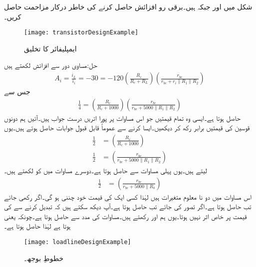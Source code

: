 شکل  میں  اور  جبکہ  ہیں۔برقی رو افزائش  حاصل کرنے کی خاطر  درکار مزاحمت حاصل کریں۔
\begin{figure}
\centering
\texttt{[image: transistorDesignExample]}
\caption{ایمپلیفائر کا تخلیق}
\label{شکل_ٹرانزسٹر_ایمپلیفائر_تخلیق}
\end{figure}

حل:مساوی دور سے افزائش لکھتے ہیں
\begin{align*}
A_i =\frac{i_L}{i_i}=-30 =-120 \left(\frac{R_c}{R_c+R_L}\right) \left(\frac{r_{be}}{r_{be}+r_i \mathbin{\|} R_1 \mathbin{\|} R_2} \right)
\end{align*}
جس سے 
\begin{align}
\frac{1}{4}=\left(\frac{R_c}{R_c+1000}\right) \left(\frac{r_{be}}{r_{be}+5000 \mathbin{\|} R_1 \mathbin{\|} R_2} \right)
\end{align}
حاصل ہوتا ہے۔ایسی وہ تمام قیمتیں جو اس مساوات پر پورا اتریں درست جواب ہیں۔آئیں ہم دونوں قوسین کی قیمتیں برابر رکھ کر دیکھیں۔ایسا کرنے سے عموماً قابل قبول جوابات حاصل ہوتے ہیں۔یوں
\begin{align*}
\frac{1}{2}&=\left(\frac{R_c}{R_c+1000}\right)\\
\frac{1}{2}&=\left(\frac{r_{be}}{r_{be}+5000 \mathbin{\|} R_1 \mathbin{\|} R_2} \right)
\end{align*}
لیتے ہیں۔یوں پہلی مساوات سے  حاصل ہوتا ہے۔دوسرے مساوات میں  کو  لکھتے ہیں۔
\begin{align*}
\frac{1}{2}&=\left(\frac{r_{be}}{r_{be}+5000 \mathbin{\|} R_b} \right)
\end{align*}
اس مساوات میں دو نا معلوم متغیرات ہیں لہٰذا کسی ایک کی قیمت خود چننی ہو گی۔اگر  رکھی جائے تب  حاصل ہوتا ہے۔اگر  تصور کی جائے تب  حاصل ہوتا ہے۔آپ دیکھ سکتے ہیں کہ   تبدیل کرنے سے  کی قیمت پر خاص اثر نہیں ہوتا۔یوں ہم  اور   رکھتے ہیں۔مساوات  کی مدد سے   حاصل ہوتا ہے۔چونکہ  یعنی  ہوتا ہے لہٰذا  حاصل ہوتا ہے۔
\begin{figure}
\centering
\texttt{[image: loadlineDesignExample]}
\caption{خطوطِ بوجھ۔}
\label{شکل_ٹرانزسٹر_ایمپلیفائر_تخلیق_بار_خطوط}
\end{figure}

